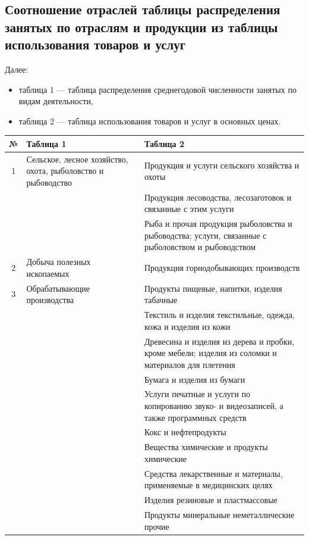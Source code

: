 \documentclass[12pt, a4paper]{article}
\begin{document}
\subsection{Соотношение отраслей таблицы распределения занятых по отраслям и продукции из таблицы использования товаров и услуг}

Далее: 
\begin{itemize}\item таблица 1 --- таблица распределения среднегодовой численности занятых по видам деятельности, \item таблица 2 --- таблица использования товаров и услуг в основных ценах.\end{itemize}

\begin{tabular}[t]{|c|p{6cm}|p{9cm}|}
\hline
	№ & Таблица 1 & Таблица 2\\
\hline
1 & Сельское, лесное хозяйство, охота, рыболовство и рыбоводство &  
 Продукция и услуги сельского хозяйства и охоты\\\cline{3-3}
 && Продукция лесоводства, лесозаготовок и связанные с этим услуги\\ \cline{3-3}
 && Рыба и прочая продукция рыболовства и рыбоводства; услуги, связанные с рыболовством и рыбоводством\\\cline{1-3}
2 & Добыча полезных ископаемых & Продукция горнодобывающих производств\\\cline{1-3}
3 & Обрабатывающие производства & Продукты пищевые, напитки, изделия табачные \\\cline{3-3}
&&Текстиль и изделия текстильные, одежда, кожа и изделия из кожи  \\ \cline{3-3}
&& Древесина и изделия из дерева и пробки, кроме мебели; изделия из соломки и материалов для плетения  \\ \cline{3-3}
&&Бумага и изделия из бумаги \\ \cline{3-3}
&& Услуги печатные и услуги по копированию звуко- и видеозаписей, а также программных средств \\ \cline{3-3}
&&Кокс и нефтепродукты \\ \cline{3-3}
&& Вещества химические и продукты химические \\ \cline{3-3}
&&Средства лекарственные и материалы, применяемые в медицинских целях \\ \cline{3-3}
&& Изделия резиновые и пластмассовые \\ \cline{3-3}
&& Продукты минеральные неметаллические прочие \\ \cline{3-3}

\end{tabular}
\end{document}
